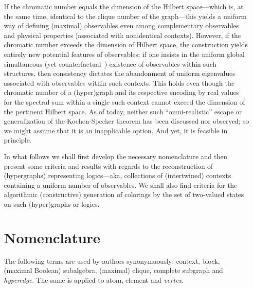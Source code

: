 \documentclass[%
12pt,
prereprint,
showpacs,
showkeys,
preprintnumbers,
amsmath,amssymb,
aps,
pra,
longbibliography,
notitlepage
]{revtex4-1}
\theoremstyle{definition}
\begin{document}
        If the chromatic number equals the dimension of the Hilbert
        space---which is, at the same time, identical to the clique number of the graph---this yields
        a uniform way of defining (maximal) observables even among complementary observables and physical properties
        (associated with nonidentical contexts).
        However, if the chromatic number exceeds the dimension of Hilbert space,
        the construction yields entirely new potential features of observables:
        if one insists in the uniform global simultaneous (yet counterfactual~\cite{specker-60}) existence of observables
        within such structures, then consistency dictates the abandonment of uniform eigenvalues associated with observables within such contexts.
        This holds even though the chromatic number of a (hyper)graph and its respective encoding by real values for the spectral sum within a single such context
        cannot exceed the dimension of the pertinent Hilbert space.
        As of today, neither such ``omni-realistic'' escape or generalization of the Kochen-Specker theorem has been discussed nor observed;
        so we might assume that it is an inapplicable option. And yet, it is feasible in principle.

        In what follows we shall first develop the necessary nomenclature and then present some criteria and results with regards to the reconstruction of (hypergraphs) representing
        logics---aka, collections of (intertwined) contexts containing a uniform number of observables.
        We shall also find criteria for the algorithmic (constructive) generation of colorings
        by the set of two-valued states on such (hyper)graphs or logics.



        \section{Nomenclature}

        The following terms are used by authors synonymuously:
        context, block, (maximal Boolean) subalgebra, (maximal) clique, complete subgraph and \emph{hyperedge}. The same is applied to atom, element and \emph{vertex}.
\end{document}

